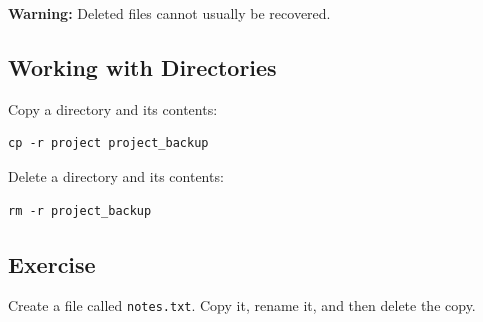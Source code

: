\textbf{Warning:} Deleted files cannot usually be recovered.

\subsection{Working with Directories}

Copy a directory and its contents:

\begin{lstlisting}
cp -r project project_backup
\end{lstlisting}

Delete a directory and its contents:

\begin{lstlisting}
rm -r project_backup
\end{lstlisting}

\subsection{Exercise}

Create a file called \texttt{notes.txt}. Copy it, rename it, and then delete the copy.
